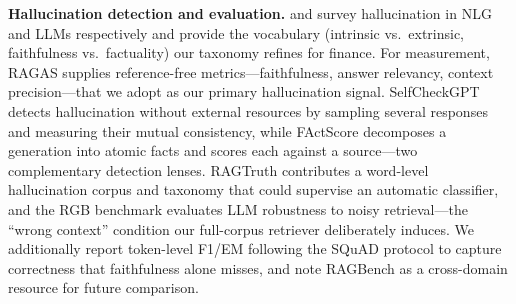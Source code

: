 \documentclass[11pt]{article}
\begin{document}
\textbf{Hallucination detection and evaluation.}
\citet{ji2023hallucination} and \citet{huang2023hallucinationsurvey}
survey hallucination in NLG and LLMs respectively and provide the
vocabulary (intrinsic vs.~extrinsic, faithfulness vs.~factuality) our
taxonomy refines for finance. For measurement, RAGAS \citep{es2024ragas}
supplies reference-free metrics---faithfulness, answer relevancy,
context precision---that we adopt as our primary hallucination signal.
SelfCheckGPT \citep{manakul2023selfcheckgpt} detects hallucination
without external resources by sampling several responses and measuring
their mutual consistency, while FActScore \citep{min2023factscore}
decomposes a generation into atomic facts and scores each against a
source---two complementary detection lenses. RAGTruth
\citep{niu2024ragtruth} contributes a word-level hallucination corpus
and taxonomy that could supervise an automatic classifier, and the RGB
benchmark \citep{chen2024rgb} evaluates LLM robustness to noisy
retrieval---the ``wrong context'' condition our full-corpus retriever
deliberately induces. We additionally report token-level F1/EM following
the SQuAD protocol \citep{rajpurkar2016squad} to capture correctness
that faithfulness alone misses, and note RAGBench
\citep{friel2024ragbench} as a cross-domain resource for future
comparison.
\end{document}

